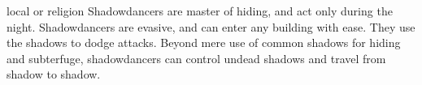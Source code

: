 {}
{local or religion}
{Shadowdancers are master of hiding, and act only during the night.}
{Shadowdancers are evasive, and can enter any building with ease. They use the shadows to dodge attacks.}
{Beyond mere use of common shadows for hiding and subterfuge, shadowdancers can control undead shadows and travel from shadow to shadow.}